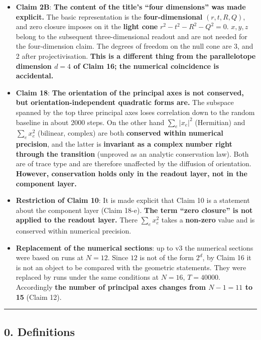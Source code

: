 \documentclass[
  10pt,
]{article}
\providecommand{\tightlist}{%
  \setlength{\itemsep}{0pt}\setlength{\parskip}{0pt}}
\begin{document}
\begin{itemize}
\tightlist
\item
  \textbf{Claim 2B}: \textbf{The content of the title's ``four
  dimensions'' was made explicit.} The basic representation is the
  \textbf{four-dimensional} \((r,t,R,Q)\), and zero closure imposes on
  it the \textbf{light cone} \(r^2-t^2-R^2-Q^2=0\). \(x,y,z\) belong to
  the subsequent three-dimensional readout and are not needed for the
  four-dimension claim. The degrees of freedom on the null cone are 3,
  and 2 after projectivisation. \textbf{This is a different thing from
  the parallelotope dimension \(d=4\) of Claim 16; the numerical
  coincidence is accidental.}
\item
  \textbf{Claim 18}: \textbf{The orientation of the principal axes is
  not conserved, but orientation-independent quadratic forms are.} The
  subspace spanned by the top three principal axes loses correlation
  down to the random baseline in about 2000 steps. On the other hand
  \(\sum_e\lvert x_e\rvert^2\) (Hermitian) and \(\sum_e x_e^2\)
  (bilinear, complex) are both \textbf{conserved within numerical
  precision}, and the latter is \textbf{invariant as a complex number
  right through the transition} (unproved as an analytic conservation
  law). Both are of trace type and are therefore unaffected by the
  diffusion of orientation. \textbf{However, conservation holds only in
  the readout layer, not in the component layer.}
\item
  \textbf{Restriction of Claim 10}: It is made explicit that Claim 10 is
  a statement about the component layer (Claim 18-e). \textbf{The term
  ``zero closure'' is not applied to the readout layer.} There
  \(\sum_e x_e^2\) takes a \textbf{non-zero} value and is conserved
  within numerical precision.
\item
  \textbf{Replacement of the numerical sections}: up to v3 the numerical
  sections were based on runs at \(N=12\). Since \(12\) is not of the
  form \(2^d\), by Claim 16 it is not an object to be compared with the
  geometric statements. They were replaced by runs under the same
  conditions at \(N=16\), \(T=40000\). Accordingly \textbf{the number of
  principal axes changes from \(N-1 = 11\) to 15} (Claim 12).
\end{itemize}

\begin{center}\rule{0.5\linewidth}{0.5pt}\end{center}

\subsection{0. Definitions}\label{definitions}
\end{document}
